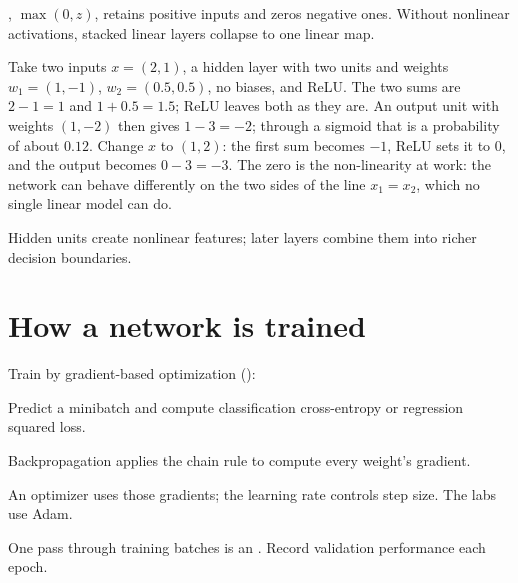 , $\max(0,z)$, retains positive inputs and zeros negative ones. Without nonlinear activations, stacked linear layers collapse to one linear map.

\begin{workedexample}
Take two inputs $x=(2,1)$, a hidden layer with two units and weights $w_1=(1,-1)$, $w_2=(0.5,0.5)$, no biases, and ReLU. The two sums are $2-1=1$ and $1+0.5=1.5$; ReLU leaves both as they are. An output unit with weights $(1,-2)$ then gives $1-3=-2$; through a sigmoid that is a probability of about $0.12$. Change $x$ to $(1,2)$: the first sum becomes $-1$, ReLU sets it to $0$, and the output becomes $0-3=-3$. The zero is the non-linearity at work: the network can behave differently on the two sides of the line $x_1=x_2$, which no single linear model can do.
\end{workedexample}

\begin{intuition}
Hidden units create nonlinear features; later layers combine them into richer decision boundaries.
\end{intuition}

\section{How a network is trained}

Train by gradient-based optimization ():

\begin{mlsteps}
  \item {} Predict a minibatch and compute classification cross-entropy or regression squared loss.
  \item {} Backpropagation applies the chain rule to compute every weight's gradient.
  \item {} An optimizer uses those gradients; the learning rate controls step size. The labs use Adam.
  \item {} One pass through training batches is an . Record validation performance each epoch.
\end{mlsteps}

